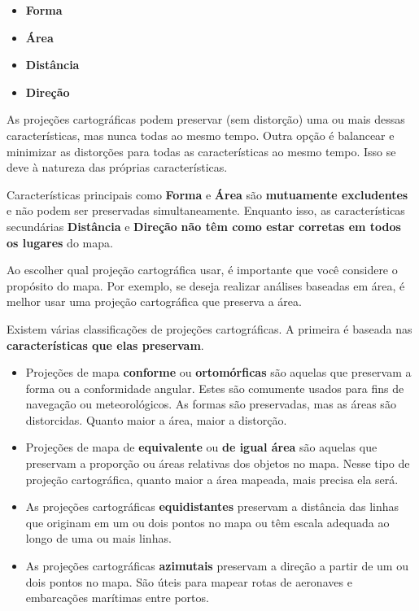 \documentclass[
]{book}
\providecommand{\tightlist}{%
  \setlength{\itemsep}{0pt}\setlength{\parskip}{0pt}}
\begin{document}
\begin{itemize}
\tightlist
\item
  \textbf{Forma}
\item
  \textbf{Área}
\item
  \textbf{Distância}
\item
  \textbf{Direção}
\end{itemize}

As projeções cartográficas podem preservar (sem distorção) uma ou mais dessas características, mas nunca todas ao mesmo tempo. Outra opção é balancear e minimizar as distorções para todas as características ao mesmo tempo. Isso se deve à natureza das próprias características.

Características principais como \textbf{Forma} e \textbf{Área} são \textbf{mutuamente excludentes} e não podem ser preservadas simultaneamente. Enquanto isso, as características secundárias \textbf{Distância} e \textbf{Direção} \textbf{não têm como estar corretas em todos os lugares} do mapa.

Ao escolher qual projeção cartográfica usar, é importante que você considere o propósito do mapa. Por exemplo, se deseja realizar análises baseadas em área, é melhor usar uma projeção cartográfica que preserva a área.

Existem várias classificações de projeções cartográficas. A primeira é baseada nas \textbf{características que elas preservam}.

\begin{itemize}
\tightlist
\item
  Projeções de mapa \textbf{conforme} ou \textbf{ortomórficas} são aquelas que preservam a forma ou a conformidade angular. Estes são comumente usados para fins de navegação ou meteorológicos. As formas são preservadas, mas as áreas são distorcidas. Quanto maior a área, maior a distorção.
\item
  Projeções de mapa de \textbf{equivalente} ou \textbf{de igual área} são aquelas que preservam a proporção ou áreas relativas dos objetos no mapa. Nesse tipo de projeção cartográfica, quanto maior a área mapeada, mais precisa ela será.
\item
  As projeções cartográficas \textbf{equidistantes} preservam a distância das linhas que originam em um ou dois pontos no mapa ou têm escala adequada ao longo de uma ou mais linhas.
\item
  As projeções cartográficas \textbf{azimutais} preservam a direção a partir de um ou dois pontos no mapa. São úteis para mapear rotas de aeronaves e embarcações marítimas entre portos.
\end{itemize}
\end{document}
